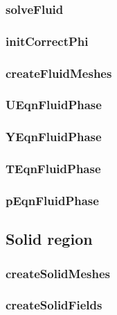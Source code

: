 \subsubsection*{solveFluid}

\subsubsection*{initCorrectPhi}

\subsubsection*{createFluidMeshes}

\subsubsection*{UEqnFluidPhase}

\subsubsection*{YEqnFluidPhase}

\subsubsection*{TEqnFluidPhase}

\subsubsection*{pEqnFluidPhase}


\subsection{Solid region}
\subsubsection*{createSolidMeshes}

\subsubsection*{createSolidFields}


